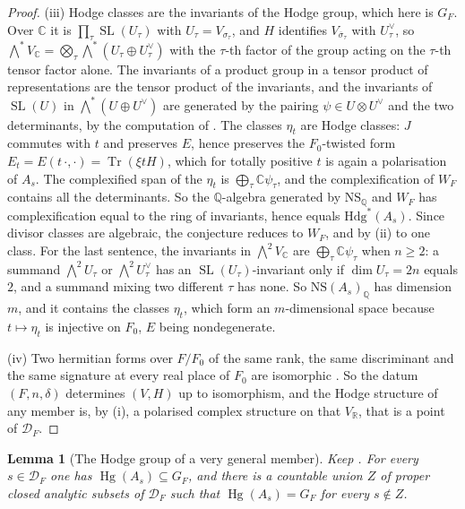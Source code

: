 \documentclass[11pt,reqno]{amsart}
\theoremstyle{plain}
\newtheorem{lemma}[theorem]{Lemma}
\theoremstyle{definition}
\theoremstyle{remark}
\newcommand{\QQ}{\mathbb{Q}}
\newcommand{\RR}{\mathbb{R}}
\newcommand{\CC}{\mathbb{C}}
\newcommand{\cD}{\mathcal{D}}
\newcommand{\Hdg}{\mathrm{Hdg}}
\newcommand{\NS}{\mathrm{NS}}
\DeclareMathOperator{\Hg}{Hg}
\DeclareMathOperator{\Tr}{Tr}
\DeclareMathOperator{\SL}{SL}
\newcommand{\bbar}[1]{\overline{#1}}
\begin{document}
\begin{proof}
(iii) Hodge classes are the invariants of the Hodge group, which here is
$G_{F}$. Over $\CC$ it is $\prod_{\tau}\SL(U_{\tau})$ with
$U_{\tau}=V_{\sigma_{\tau}}$, and
$H$ identifies $V_{\bbar\sigma_{\tau}}$ with $U_{\tau}^{\vee}$, so
$\bigwedge^{*}V_{\CC}=\bigotimes_{\tau}\bigwedge^{*}(U_{\tau}\oplus U_{\tau}^{\vee})$
with the $\tau$-th factor of the group acting on the $\tau$-th tensor factor
alone. The invariants of a product group in a tensor product of
representations are the tensor product of the invariants, and the invariants
of $\SL(U)$ in $\bigwedge^{*}(U\oplus U^{\vee})$ are generated by the pairing
$\psi\in U\otimes U^{\vee}$ and the two determinants, by the computation of
. The classes $\eta_{t}$ are Hodge classes: $J$ commutes
with $t$ and preserves $E$, hence preserves the $F_{0}$-twisted form
$E_{t}=E(t\,\cdot,\cdot)=\Tr(\xi tH)$, which for totally positive $t$ is again
a polarisation of $A_{s}$. The complexified span of the $\eta_{t}$ is
$\bigoplus_{\tau}\CC\psi_{\tau}$, and the complexification of $W_{F}$
contains all the determinants. So the $\QQ$-algebra generated by $\NS_{\QQ}$
and $W_{F}$ has complexification equal to the ring of invariants, hence
equals $\Hdg^{*}(A_{s})$. Since divisor classes are algebraic, the conjecture
reduces to $W_{F}$, and by (ii) to one class. For the last sentence, the
invariants in $\bigwedge^{2}V_{\CC}$ are $\bigoplus_{\tau}\CC\psi_{\tau}$ when
$n\ge2$: a summand $\bigwedge^{2}U_{\tau}$ or $\bigwedge^{2}U_{\tau}^{\vee}$
has an $\SL(U_{\tau})$-invariant only if $\dim U_{\tau}=2n$ equals $2$, and a
summand mixing two different $\tau$ has none. So $\NS(A_{s})_{\QQ}$ has
dimension $m$, and it contains the classes $\eta_{t}$, which form an
$m$-dimensional space because $t\mapsto\eta_{t}$ is injective on $F_{0}$, $E$
being nondegenerate.

(iv) Two hermitian forms over $F/F_{0}$ of the same rank, the same
discriminant and the same signature at every real place of $F_{0}$ are
isomorphic \cite[Ch.~10, \S6]{Sch85}. So the datum $(F,n,\delta)$ determines
$(V,H)$ up to isomorphism, and the Hodge structure of any member is, by (i), a
polarised complex structure on that $V_{\RR}$, that is a point of $\cD_{F}$.
\end{proof}

\begin{lemma}[The Hodge group of a very general member]\label{lem:cmgeneric}
Keep . For every $s\in\cD_{F}$ one has
$\Hg(A_{s})\subseteq G_{F}$, and there is a countable union $Z$ of proper
closed analytic subsets of $\cD_{F}$ such that $\Hg(A_{s})=G_{F}$ for every
$s\notin Z$.
\end{lemma}
\end{document}
